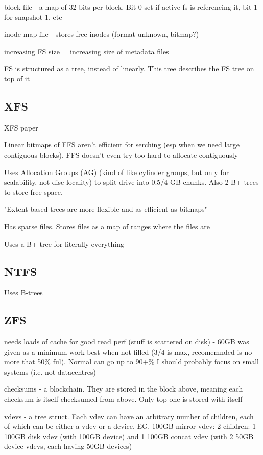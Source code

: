 \documentclass[a4paper]{article}
\begin{document}
        block file - a map of 32 bits per block. Bit 0 set if active fs is referencing
        it, bit 1 for snapshot 1, etc

        inode map file - stores free inodes (format unknown, bitmap?)

        increasing FS size = increasing size of metadata files

        FS is structured as a tree, instead of linearly. This tree describes
        the FS tree on top of it

    \subsection{XFS}
        XFS paper

        Linear bitmaps of FFS aren't efficient for serching (esp when we need
        large contiguous blocks). FFS doesn't even try too hard to allocate
        contiguously

        Uses Allocation Groups (AG) (kind of like cylinder groups, but only for
        scalability, not disc locality) to split drive into 0.5/4 GB chunks.
        Also 2 B+ trees to store free space.

        "Extent based trees are more flexible and as efficient as bitmaps"

        Has sparse files. Stores files as a map of ranges where the files are

        Uses a B+ tree for literally everything

    \subsection{NTFS}

        Uses B-trees


    \subsection{ZFS}
        needs loads of cache for good read perf (stuff is scattered on disk) -
        60GB was given as a minimum work best when not filled (3/4 is max,
        recomemnded is no more that 50\% ful). Normal can go up to 90+\% I
        should probably focus on small systems (i.e. not datacentres)

        checksums - a blockchain. They are stored in the block above, meaning
        each checksum is itself checksumed from above. Only top one is stored
        with itself

        vdevs - a tree struct. Each vdev can have an arbitrary number of
        children, each of which can be either a vdev or a device. EG. 100GB
        mirror vdev: 2 children: 1 100GB disk vdev (with 100GB device) and 1
        100GB concat vdev (with 2 50GB device vdevs, each having 50GB devices)
\end{document}
